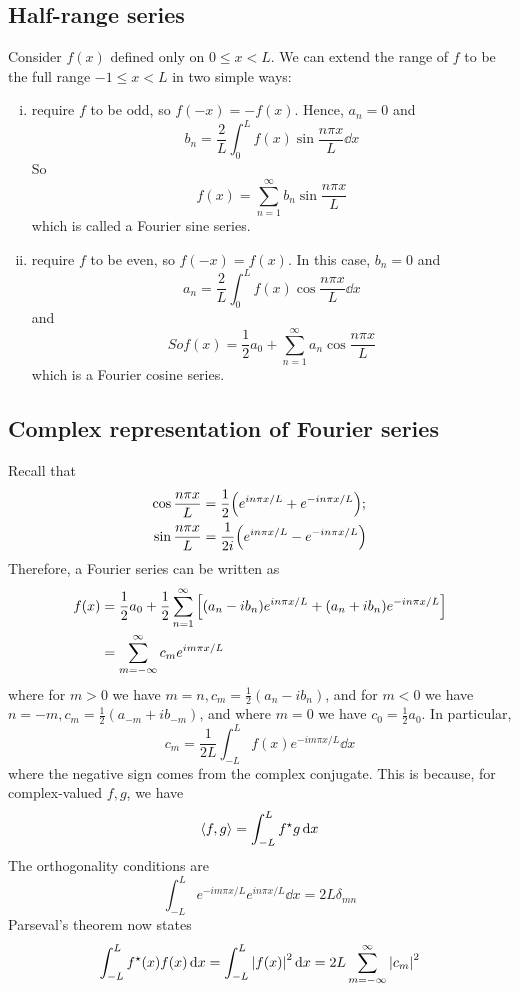 \subsection{Half-range series}
Consider \( f(x) \) defined only on \( 0 \leq x < L \).
We can extend the range of \( f \) to be the full range \( -1 \leq x < L \) in two simple ways:
\begin{enumerate}[(i)]
	\item require \( f \) to be odd, so \( f(-x) = -f(x) \).
	      Hence, \( a_n = 0 \) and
	      \[
		      b_n = \frac{2}{L} \int_0^L f(x) \sin \frac{n \pi x}{L} \dd{x}
	      \]
	      So
	      \[
		      f(x) = \sum_{n=1}^\infty b_n \sin \frac{n\pi x}{L}
	      \]
	      which is called a Fourier sine series.
	\item require \( f \) to be even, so \( f(-x) = f(x) \).
	      In this case, \( b_n = 0 \) and
	      \[
		      a_n = \frac{2}{L} \int_0^L f(x) \cos \frac{n \pi x}{L} \dd{x}
	      \]
	      and
	      \[
		      So f(x) = \frac{1}{2}a_0 + \sum_{n=1}^\infty a_n \cos \frac{n\pi x}{L}
	      \]
	      which is a Fourier cosine series.
\end{enumerate}

\subsection{Complex representation of Fourier series}
Recall that
\begin{align*}
	\cos \frac{n \pi x}{L} & = \frac{1}{2}\qty(e^{i n \pi x / L} + e^{-i n \pi x / L}); \\
	\sin \frac{n \pi x}{L} & = \frac{1}{2i}\qty(e^{i n \pi x / L} - e^{-i n \pi x / L})
\end{align*}
Therefore, a Fourier series can be written as
\begin{align*}
	f(x) & = \frac{1}{2} a_0 + \frac{1}{2} \sum_{n=1}^\infty \qty[ (a_n - i b_n) e^{i n \pi x / L} + (a_n + i b_n) e^{-i n \pi x / L} ] \\
	     & = \sum_{m=-\infty}^\infty c_m e^{i m \pi x / L}
\end{align*}
where for \( m > 0 \) we have \( m=n, c_m = \frac{1}{2}(a_n - ib_n) \), and for \( m < 0 \) we have \( n = -m, c_m = \frac{1}{2}(a_{-m} + ib_{-m}) \), and where \( m = 0 \) we have \( c_0 = \frac{1}{2} a_0 \).
In particular,
\[
	c_m = \frac{1}{2L} \int_{-L}^L f(x) e^{-i m \pi x / L} \dd{x}
\]
where the negative sign comes from the complex conjugate.
This is because, for complex-valued \( f, g \), we have
\[
	\left\langle{f,g}\right\rangle = \int_{-L}^L f^\star g \dd{x}
\]
The orthogonality conditions are
\[
	\int_{-L}^L e^{-i m \pi x / L} e^{i n \pi x / L} \dd{x} = 2L \delta_{mn}
\]
Parseval's theorem now states
\[
	\int_{-L}^L f^\star(x) f(x) \dd{x} = \int_{-L}^L \abs{f(x)}^2 \dd{x} = 2L \sum_{m=-\infty}^\infty \abs{c_m}^2
\]

